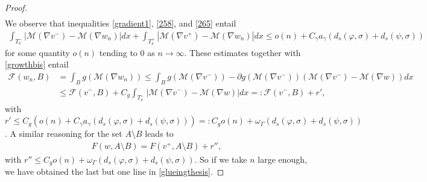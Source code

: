 \documentclass[10pt,a4paper]{amsart}
\newcommand{\R}{\mathbb{R}}
\begin{document}
\begin{proof}
\begin{align}
	\end{align}
We observe that inequalities 
	\eqref{gradient1}, \eqref{258}, and \eqref{265} entail
	\begin{align*}
		\int_{T^-_\delta}|\mathcal M(\nabla v^-)-\mathcal M(\nabla w_n)|dx+\int_{T^+_\delta}|\mathcal M(\nabla v^+)-\mathcal M(\nabla w_n)|dx
		\leq o(n)+C_\gamma a_\gamma(d_s(\varphi,\sigma)+d_s(\psi,\sigma))
	\end{align*}
	for some quantity $o(n)$ tending to $0$ as $n\rightarrow\infty$. These estimates together with \eqref{growthbis} entail
	\begin{align}\label{268}
		\mathcal F(w_n,B)&=\int_Bg(\mathcal M(\nabla w_n))\leq\int_Bg(\mathcal M(\nabla v^-))-\partial g(\mathcal M(\nabla v^-))(\mathcal M(\nabla v^-)-\mathcal M(\nabla w))dx\nonumber\\
		&\leq \mathcal F(v^-,B)+C_g \int_{T_\delta^-}|\mathcal M(\nabla v^-)-\mathcal M(\nabla w)| dx=:\mathcal F(v^-,B)+r',
	\end{align} 
	with $r'\leq C_g(o(n)+C_\gamma a_\gamma(d_s(\varphi,\sigma)+d_s(\psi,\sigma))) =:C_g o(n)+\omega_\Gamma(d_s(\varphi,\sigma)+d_s(\psi,\sigma))$. A similar reasoning  for the set $A\setminus B$ leads to
	\begin{align*}
	F(w,A\setminus B)=F(v^+,A\setminus B)+r'',
	\end{align*}
with $r''\leq C_g o(n)+\omega_\Gamma(d_s(\varphi,\sigma)+d_s(\psi,\sigma))$. So if we take $n$ large enough, we have obtained the last but one line in \eqref{glueingthesis}.

\end{proof}
\end{document}
